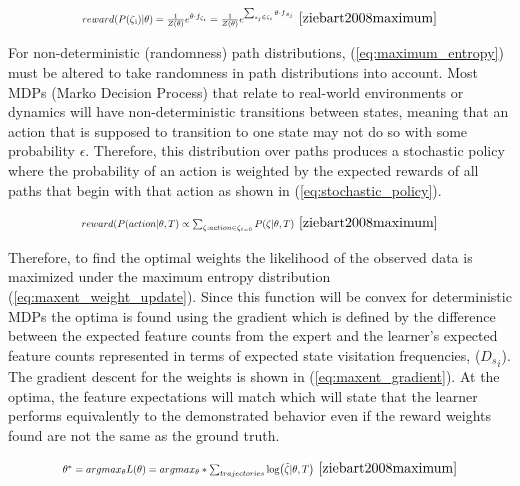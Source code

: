 \documentclass[12pt,american]{report}
\begin{document}
\begin{equation}
            \label{eq:maximum_entropy}
            \resizebox{0.44\textwidth}{!}{$reward(P(\zeta\textsubscript{i})|\theta)= \frac{1}{Z(\theta)} e^{\theta \cdot f_{\zeta_i}}=  \frac{1}{Z(\theta)} e^{\sum_{s_j\in\zeta_i}^{}\theta \cdot f\textsubscript{$s_j$}}$}~\cite{ziebart2008maximum}%
        \end{equation}

For non-deterministic (randomness) path distributions, (\ref{eq:maximum_entropy}) must be altered to take randomness in path distributions into account. Most MDPs (Marko Decision Process) that relate to real-world environments or dynamics will have non-deterministic transitions between states, meaning that an action that is supposed to transition to one state may not do so with some probability $\epsilon$.  Therefore, this distribution over paths produces a stochastic policy where the probability of an action is weighted by the expected rewards of all paths that begin with that action as shown in (\ref{eq:stochastic_policy}).

\begin{equation}
            \label{eq:stochastic_policy}
            \resizebox{0.44\textwidth}{!}{$reward(P(action | \theta, T) \propto \sum_{\zeta:action\in\zeta_{t=0}}^{}P(\zeta | \theta, T)$}~\cite{ziebart2008maximum}%
        \end{equation}

Therefore, to find the optimal weights the likelihood of the observed data is maximized under the maximum entropy distribution (\ref{eq:maxent_weight_update}). Since this function will be convex for deterministic MDPs the optima is found using the gradient  which is defined by the difference between the expected feature counts from the expert and the learner's expected feature counts represented in terms of expected state visitation frequencies, (${{}D_s}_{i}$).  The gradient descent for the weights is shown in (\ref{eq:maxent_gradient}). At the optima, the feature expectations will match which will state that the learner performs equivalently to the demonstrated behavior even if the reward weights found are not the same as the ground truth.

\begin{equation}
            \label{eq:maxent_weight_update}
            \resizebox{0.52\textwidth}{!}{$\theta^* = argmax_\theta L(\theta) = argmax_\theta * \sum_{trajectories}^{}\log(\tilde\zeta|\theta,T)$}~\cite{ziebart2008maximum}%
        \end{equation}
\end{document}
